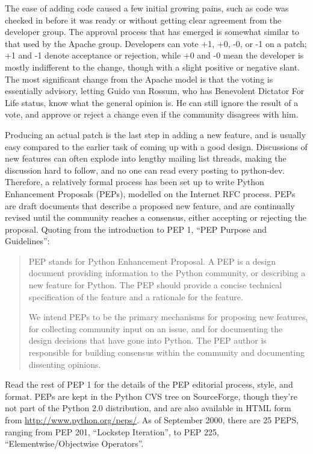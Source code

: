 \documentclass{howto}
\begin{document}
The ease of adding code caused a few initial growing pains, such as
code was checked in before it was ready or without getting clear
agreement from the developer group.  The approval process that has
emerged is somewhat similar to that used by the Apache group.
Developers can vote +1, +0, -0, or -1 on a patch; +1 and -1 denote
acceptance or rejection, while +0 and -0 mean the developer is mostly
indifferent to the change, though with a slight positive or negative
slant.  The most significant change from the Apache model is that the
voting is essentially advisory, letting Guido van Rossum, who has
Benevolent Dictator For Life status, know what the general opinion is.
He can still ignore the result of a vote, and approve or
reject a change even if the community disagrees with him.

Producing an actual patch is the last step in adding a new feature,
and is usually easy compared to the earlier task of coming up with a
good design.  Discussions of new features can often explode into
lengthy mailing list threads, making the discussion hard to follow,
and no one can read every posting to python-dev.  Therefore, a
relatively formal process has been set up to write Python Enhancement
Proposals (PEPs), modelled on the Internet RFC process.  PEPs are
draft documents that describe a proposed new feature, and are
continually revised until the community reaches a consensus, either
accepting or rejecting the proposal.  Quoting from the introduction to
PEP 1, ``PEP Purpose and Guidelines'':

\begin{quotation}
    PEP stands for Python Enhancement Proposal.  A PEP is a design
    document providing information to the Python community, or
    describing a new feature for Python.  The PEP should provide a
    concise technical specification of the feature and a rationale for
    the feature.

    We intend PEPs to be the primary mechanisms for proposing new
    features, for collecting community input on an issue, and for
    documenting the design decisions that have gone into Python.  The
    PEP author is responsible for building consensus within the
    community and documenting dissenting opinions.
\end{quotation}

Read the rest of PEP 1 for the details of the PEP editorial process,
style, and format.  PEPs are kept in the Python CVS tree on
SourceForge, though they're not part of the Python 2.0 distribution,
and are also available in HTML form from
\url{http://www.python.org/peps/}.  As of September 2000,
there are 25 PEPS, ranging from PEP 201, ``Lockstep Iteration'', to
PEP 225, ``Elementwise/Objectwise Operators''.
\end{document}
